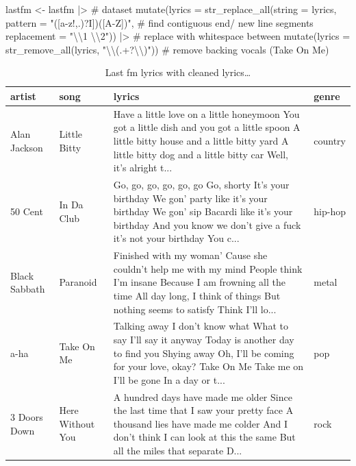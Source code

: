 \documentclass[
  letterpaper,
]{latex/krantz}
\newenvironment{Shaded}{\begin{snugshade}}{\end{snugshade}}
\newcommand{\AttributeTok}[1]{\textcolor[rgb]{0.40,0.45,0.13}{#1}}
\newcommand{\CommentTok}[1]{\textcolor[rgb]{0.37,0.37,0.37}{#1}}
\newcommand{\FunctionTok}[1]{\textcolor[rgb]{0.28,0.35,0.67}{#1}}
\newcommand{\NormalTok}[1]{\textcolor[rgb]{0.00,0.23,0.31}{#1}}
\newcommand{\OtherTok}[1]{\textcolor[rgb]{0.00,0.23,0.31}{#1}}
\newcommand{\SpecialCharTok}[1]{\textcolor[rgb]{0.37,0.37,0.37}{#1}}
\newcommand{\StringTok}[1]{\textcolor[rgb]{0.13,0.47,0.30}{#1}}
\begin{document}
\begin{Shaded}
\begin{Highlighting}[]
\NormalTok{lastfm }\OtherTok{\textless{}{-}} 
\NormalTok{  lastfm }\SpecialCharTok{|\textgreater{}} \CommentTok{\# dataset}
  \FunctionTok{mutate}\NormalTok{(}\AttributeTok{lyrics =} 
           \FunctionTok{str\_replace\_all}\NormalTok{(}\AttributeTok{string =}\NormalTok{ lyrics, }
                           \AttributeTok{pattern =} \StringTok{"([a{-}z\textquotesingle{}!,.)?I])([A{-}Z])"}\NormalTok{, }\CommentTok{\# find contiguous end/ new line segments}
                           \AttributeTok{replacement =} \StringTok{"}\SpecialCharTok{\textbackslash{}\textbackslash{}}\StringTok{1 }\SpecialCharTok{\textbackslash{}\textbackslash{}}\StringTok{2"}\NormalTok{)) }\SpecialCharTok{|\textgreater{}}  \CommentTok{\# replace with whitespace between}
  \FunctionTok{mutate}\NormalTok{(}\AttributeTok{lyrics =} \FunctionTok{str\_remove\_all}\NormalTok{(lyrics, }\StringTok{"}\SpecialCharTok{\textbackslash{}\textbackslash{}}\StringTok{(.+?}\SpecialCharTok{\textbackslash{}\textbackslash{}}\StringTok{)"}\NormalTok{)) }\CommentTok{\# remove backing vocals (Take On Me)}
\end{Highlighting}
\end{Shaded}

\hypertarget{tbl-td-lastfm-clean-end-lines-preview}{}
\begin{table}
\caption{\label{tbl-td-lastfm-clean-end-lines-preview}Last fm lyrics with cleaned lyrics\ldots{} }\tabularnewline

\centering
\begin{tabular}{llll}
\toprule
artist & song & lyrics & genre\\
\midrule
Alan Jackson & Little Bitty & Have a little love on a little honeymoon You got a little dish and you got a little spoon A little bitty house and a little bitty yard A little bitty dog and a little bitty car Well, it's alright t... & country\\
50 Cent & In Da Club & Go, go, go, go, go, go Go, shorty It's your birthday We gon' party like it's your birthday We gon' sip Bacardi like it's your birthday And you know we don't give a fuck it's not your birthday You c... & hip-hop\\
Black Sabbath & Paranoid & Finished with my woman' Cause she couldn't help me with my mind People think I'm insane Because I am frowning all the time All day long, I think of things But nothing seems to satisfy Think I'll lo... & metal\\
a-ha & Take On Me & Talking away I don't know what What to say I'll say it anyway Today is another day to find you Shying away Oh, I'll be coming for your love, okay? Take On Me  Take me on  I'll be gone In a day or t... & pop\\
3 Doors Down & Here Without You & A hundred days have made me older Since the last time that I saw your pretty face A thousand lies have made me colder And I don't think I can look at this the same But all the miles that separate D... & rock\\
\bottomrule
\end{tabular}
\end{table}
\end{document}
